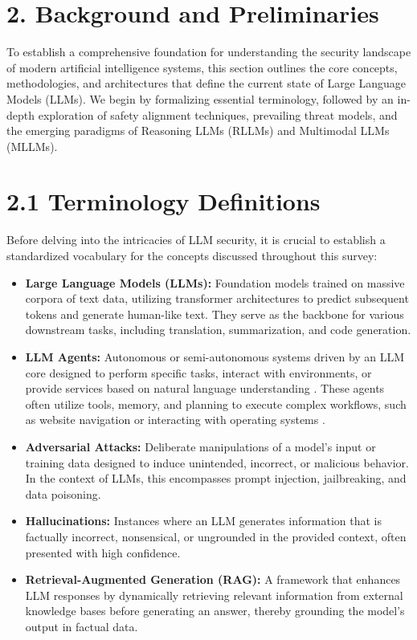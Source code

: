\documentclass[11pt,a4paper]{article}
\begin{document}
\section{2. Background and Preliminaries}

To establish a comprehensive foundation for understanding the security landscape of modern artificial intelligence systems, this section outlines the core concepts, methodologies, and architectures that define the current state of Large Language Models (LLMs). We begin by formalizing essential terminology, followed by an in-depth exploration of safety alignment techniques, prevailing threat models, and the emerging paradigms of Reasoning LLMs (RLLMs) and Multimodal LLMs (MLLMs).

\section{2.1 Terminology Definitions}

Before delving into the intricacies of LLM security, it is crucial to establish a standardized vocabulary for the concepts discussed throughout this survey:

\begin{itemize}
  \item \textbf{Large Language Models (LLMs):} Foundation models trained on massive corpora of text data, utilizing transformer architectures to predict subsequent tokens and generate human-like text. They serve as the backbone for various downstream tasks, including translation, summarization, and code generation.
  \item \textbf{LLM Agents:} Autonomous or semi-autonomous systems driven by an LLM core designed to perform specific tasks, interact with environments, or provide services based on natural language understanding \cite{Wang_2024_LLM}. These agents often utilize tools, memory, and planning to execute complex workflows, such as website navigation or interacting with operating systems \cite{Wang_2024_LLM}.
  \item \textbf{Adversarial Attacks:} Deliberate manipulations of a model's input or training data designed to induce unintended, incorrect, or malicious behavior. In the context of LLMs, this encompasses prompt injection, jailbreaking, and data poisoning.
  \item \textbf{Hallucinations:} Instances where an LLM generates information that is factually incorrect, nonsensical, or ungrounded in the provided context, often presented with high confidence.
  \item \textbf{Retrieval-Augmented Generation (RAG):} A framework that enhances LLM responses by dynamically retrieving relevant information from external knowledge bases before generating an answer, thereby grounding the model's output in factual data.
\end{itemize}
\end{document}
